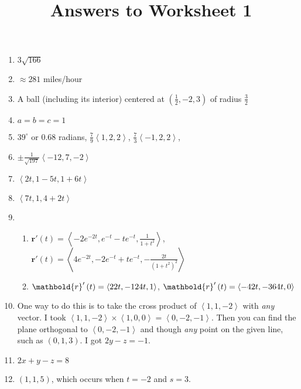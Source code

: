 \documentclass[12pt]{article}
\title{Answers to Worksheet 1}
\author{}\date{}
\let\sin\relax\DeclareMathOperator{\sin}{\mathsf{sin}}
\let\cos\relax\DeclareMathOperator{\cos}{\mathsf{cos}}
\begin{document}
\maketitle
\thispagestyle{empty}

\begin{enumerate}
\item $3\sqrt{166}$
\item $\approx 281$ miles/hour
\item A ball (including its interior)
centered at $\left(\frac{1}{2},-2,3\right)$
of radius $\frac{3}{2}$
\item $a=b=c=1$
\item $39^\circ$ or $0.68$ radians,
$\frac{7}{9}\left\langle 1,2,2\right\rangle$,
$\frac{7}{3}\left\langle -1,2,2\right\rangle$,
\item $\pm\frac{1}{\sqrt{197}}\left\langle -12,7,-2\right\rangle$
\item $\left\langle 2t,1-5t,1+6t\right\rangle$
\item $\left\langle 7t,1,4+2t\right\rangle$
\item\begin{enumerate}
\item $\mathbold{r}'\left(t\right)=
\left\langle -2e^{-2t},e^{-t}-te^{-t},\frac{1}{1+t^2}\right\rangle$,
$\mathbold{r}'\left(t\right)=
\left\langle 4e^{-2t},-2e^{-t}+te^{-t},-\frac{2t}{\left(1+t^2\right)^2}\right\rangle$
\item $\mathbold{r}'\left(t\right)=
\left\langle 2\cos{2t},-12\sin{4t},1\right\rangle$,
$\mathbold{r}'\left(t\right)=
\left\langle -4\sin{2t},-36\cos{4t},0\right\rangle$
\end{enumerate}
\item One way to do this is to take the cross product
of $\left\langle 1,1,-2\right\rangle$ with {\em any}
vector. I took $\left\langle 1,1,-2\right\rangle\times
\left\langle 1,0,0\right\rangle=\left\langle 0,-2,-1\right\rangle$.
Then you can find the plane orthogonal to $\left\langle 0,-2,-1\right\rangle$
and though {\em any} point on the given line, such as $\left(0,1,3\right)$.
I got $2y-z=-1$.
\item $2x+y-z=8$
\item $\left(1,1,5\right)$, which occurs when $t=-2$ and $s=3$.
\end{enumerate}
\end{document}
